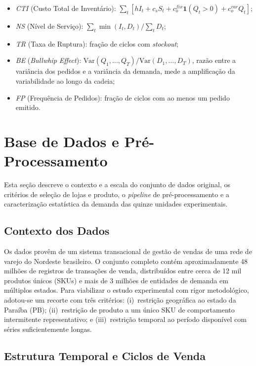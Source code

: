 \documentclass[a4paper,11pt]{article}
\begin{document}
\begin{itemize}
  \item \emph{CTI} (Custo Total de Inventário):
    $\sum_{t}[h I_t + c_s S_t + c_o^{fix}\mathbf{1}(Q_t>0) + c_o^{var}Q_t]$;
  \item \emph{NS} (Nível de Serviço):
    $\sum_t \min(I_t, D_t) / \sum_t D_t$;
  \item \emph{TR} (Taxa de Ruptura): fração de ciclos com \textit{stockout};
  \item \emph{BE} (\textit{Bullwhip Effect}):
    $\mathrm{Var}(Q_1,\ldots,Q_T)/\mathrm{Var}(D_1,\ldots,D_T)$,
    razão entre a variância dos pedidos e a variância da demanda,
    mede a amplificação da variabilidade ao longo da cadeia;
  \item \emph{FP} (Frequência de Pedidos): fração de ciclos com
    ao menos um pedido emitido.
\end{itemize}

\section{Base de Dados e Pré-Processamento}

Esta seção descreve o contexto e a escala do conjunto de dados
original, os critérios de seleção de lojas e produto, o
\textit{pipeline} de pré-processamento e a caracterização
estatística da demanda das quinze unidades experimentais.

\subsection{Contexto dos Dados}

Os dados provêm de um sistema transacional de gestão de vendas de
uma rede de varejo do Nordeste brasileiro. O conjunto completo
contém aproximadamente 48 milhões de registros de transações de
venda, distribuídos entre cerca de 12 mil produtos únicos (SKUs) e
mais de 3 milhões de entidades de demanda em múltiplos estados.
Para viabilizar o estudo experimental com rigor metodológico,
adotou-se um recorte com três critérios: (i)~restrição geográfica
ao estado da Paraíba (PB); (ii)~restrição de produto a um único
SKU de comportamento intermitente representativo; e (iii)~restrição
temporal ao período disponível com séries suficientemente longas.

\subsection{Estrutura Temporal e Ciclos de Venda}
\end{document}
